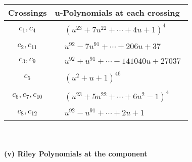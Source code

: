 \documentclass[1p]{elsarticle_modified}
\theoremstyle{definition}
\begin{document}
\begin{tabular}{m{50pt}|m{274pt}}
Crossings & \hspace{64pt}u-Polynomials at each crossing \\
\hline $$\begin{aligned}c_{1},c_{4}\end{aligned}$$&$\begin{aligned}
&(u^{23}+7 u^{22}+\cdots+4 u+1)^{4}
\end{aligned}$\\
\hline $$\begin{aligned}c_{2},c_{11}\end{aligned}$$&$\begin{aligned}
&u^{92}-7 u^{91}+\cdots+206 u+37
\end{aligned}$\\
\hline $$\begin{aligned}c_{3},c_{9}\end{aligned}$$&$\begin{aligned}
&u^{92}+u^{91}+\cdots-141040 u+27037
\end{aligned}$\\
\hline $$\begin{aligned}c_{5}\end{aligned}$$&$\begin{aligned}
&(u^2+u+1)^{46}
\end{aligned}$\\
\hline $$\begin{aligned}c_{6},c_{7},c_{10}\end{aligned}$$&$\begin{aligned}
&(u^{23}+5 u^{22}+\cdots+6 u^2-1)^{4}
\end{aligned}$\\
\hline $$\begin{aligned}c_{8},c_{12}\end{aligned}$$&$\begin{aligned}
&u^{92}- u^{91}+\cdots+2 u+1
\end{aligned}$\\
\hline
\end{tabular}\\~\\
\newpage\renewcommand{\arraystretch}{1}
\flushleft \textbf{(v) Riley Polynomials at the component}\newline \\
\end{document}
